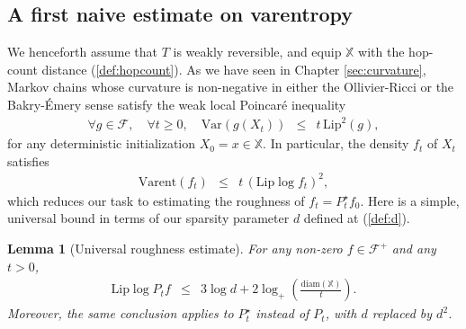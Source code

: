 \documentclass[12pt,final]{article}
\newtheorem{lemma}{Lemma}[section]
\numberwithin{equation}{section}
\newcommand{\Lip}{\mathrm {Lip}}
\newcommand{\Varent}{\mathrm{Varent}}
\newcommand{\Var}{\mathrm{Var}}
\newcommand{\cF}{\mathcal {F}}
\newcommand{\dX}{\mathbb{X}}
\newcommand{\diam}{\mathrm{diam}}
\begin{document}
\subsection{A first naive estimate on varentropy}
We henceforth assume that $T$ is weakly reversible, and  equip $\dX$  with the hop-count distance (\ref{def:hopcount}). As we have seen in Chapter \ref{sec:curvature}, Markov chains whose curvature is non-negative in either the Ollivier-Ricci  or  the Bakry-\'Emery sense satisfy the weak local Poincaré inequality
\begin{eqnarray*}
\forall g\in\cF,\quad\forall t\ge 0,\quad\Var\left(g(X_t)\right) & \le & t \,\Lip^2(g),
\end{eqnarray*}
for any deterministic initialization $X_0=x\in\dX$. In particular, the density $f_t$ of $X_t$ satisfies
\begin{eqnarray}
\label{varent:naive}
\Varent(f_t) & \le & t\, \left(\Lip \log f_t\right)^2,
\end{eqnarray}
which reduces our task to estimating the roughness of $f_t=P_t^\star f_0$. Here is a simple, universal bound in terms of our sparsity parameter $d$ defined at (\ref{def:d}). 
\begin{lemma}[Universal roughness estimate]\label{lm:lip}For any non-zero $f\in \cF^+$ and any $t> 0$,
\begin{eqnarray*}
\Lip \log P_t f & \le & 3\log d+2\log_+\left(\frac{\diam(\dX)}{t}\right).
\end{eqnarray*}
Moreover, the same conclusion applies to $P_t^\star$ instead of $P_t$, with $d$ replaced by $d^2$.
\end{lemma}
\end{document}

